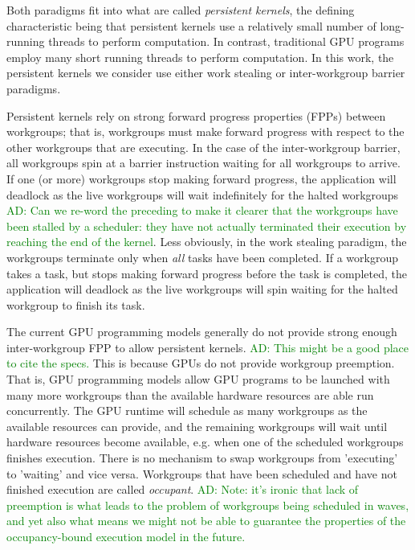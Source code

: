 \documentclass[nocopyrightspace]{sigplanconf-pldi16}
\newcommand{\ADComment}[1]{\textcolor{green}{AD: #1}}
\begin{document}
Both paradigms fit into what are called \emph{persistent kernels}, the
defining characteristic being that persistent kernels use a relatively
small number of long-running threads to perform computation. In
contrast, traditional GPU programs employ many short running threads
to perform computation. In this work, the persistent kernels we consider
use either work stealing or inter-workgroup barrier paradigms.

Persistent kernels rely on strong forward progress properties (FPPs)
between workgroups; that is, workgroups must make forward progress with respect to
the other workgroups that are executing. In the case of the inter-workgroup barrier, all
workgroups spin at a barrier instruction waiting for all workgroups to
arrive. If one (or more) workgroups stop making forward progress, the
application will deadlock as the live workgroups will wait
indefinitely for the halted workgroups \ADComment{Can we re-word the preceding to make it clearer that the workgroups have been stalled by a scheduler: they have not actually terminated their execution by reaching the end of the kernel}. Less obviously, in the work
stealing paradigm, the workgroups terminate only when \emph{all} tasks
have been completed. If a workgroup takes a task, but stops making
forward progress before the task is completed, the application will
deadlock as the live workgroups will spin waiting for the halted
workgroup to finish its task.

The current GPU programming models generally do not provide strong
enough inter-workgroup FPP to allow persistent kernels. \ADComment{This might be a good place to cite the specs.}  This is
because GPUs do not provide workgroup preemption. That is, GPU
programming models allow GPU programs to be launched with many more
workgroups than the available hardware resources are able run
concurrently. The GPU runtime will schedule as many workgroups as the
available resources can provide, and the remaining workgroups will
wait until hardware resources become available, e.g.  when one of the
scheduled workgroups finishes execution. There is no mechanism to swap
workgroups from 'executing' to 'waiting' and vice versa. Workgroups
that have been scheduled and have not finished execution are called
\emph{occupant}.  \ADComment{Note: it's ironic that lack of preemption is what leads to the problem of workgroups being scheduled in waves, and yet also what means we might not be able to guarantee the properties of the occupancy-bound execution model in the future.}
\end{document}
